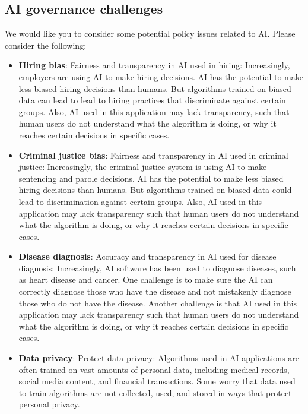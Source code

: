 \documentclass{article}
\begin{document}
\subsection{AI governance challenges}

\noindent We would like you to consider some potential policy issues related to AI. Please consider the following:


\begin{itemize}
\item \textbf{Hiring bias}: Fairness and transparency in AI used in hiring: Increasingly, employers are using AI to make hiring decisions. AI has the potential to make less biased hiring decisions than humans. But algorithms trained on biased data can lead to lead to hiring practices that discriminate against certain groups. Also, AI used in this application may lack transparency, such that human users do not understand what the algorithm is doing, or why it reaches certain decisions in specific cases.
\item \textbf{Criminal justice bias}: Fairness and transparency in AI used in criminal justice: Increasingly, the criminal justice system is using AI to make sentencing and parole decisions. AI has the potential to make less biased hiring decisions than humans. But algorithms trained on biased data could lead to discrimination against certain groups. Also, AI used in this application may lack transparency such that human users do not understand what the algorithm is doing, or why it reaches certain decisions in specific cases.
\item \textbf{Disease diagnosis}: Accuracy and transparency in AI used for disease diagnosis: Increasingly, AI software has been used to diagnose diseases, such as heart disease and cancer. One challenge is to make sure the AI can correctly diagnose those who have the disease and not mistakenly diagnose those who do not have the disease. Another challenge is that AI used in this application may lack transparency such that human users do not understand what the algorithm is doing, or why it reaches certain decisions in specific cases.
\item \textbf{Data privacy}: Protect data privacy: Algorithms used in AI applications are often trained on vast amounts of personal data, including medical records, social media content, and financial transactions. Some worry that data used to train algorithms are not collected, used, and stored in ways that protect personal privacy.

\end{itemize}
\end{document}

